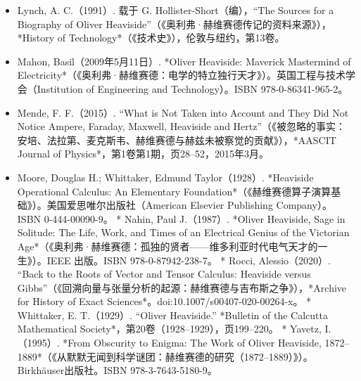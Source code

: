 \begin{itemize}
\item Lynch, A. C.（1991）. 载于 G. Hollister-Short（编），“The Sources for a Biography of Oliver Heaviside”（《奥利弗·赫维赛德传记的资料来源》），*History of Technology*（《技术史》），伦敦与纽约，第13卷。
\item Mahon, Basil（2009年5月11日）. *Oliver Heaviside: Maverick Mastermind of Electricity*（《奥利弗·赫维赛德：电学的特立独行天才》）。英国工程与技术学会（Institution of Engineering and Technology）。ISBN 978-0-86341-965-2。
\item Mende, F. F.（2015）. “What is Not Taken into Account and They Did Not Notice Ampere, Faraday, Maxwell, Heaviside and Hertz”（《被忽略的事实：安培、法拉第、麦克斯韦、赫维赛德与赫兹未被察觉的贡献》），*AASCIT Journal of Physics*，第1卷第1期，页28–52，2015年3月。
\item Moore, Douglas H.; Whittaker, Edmund Taylor（1928）. *Heaviside Operational Calculus: An Elementary Foundation*（《赫维赛德算子演算基础》）。美国爱思唯尔出版社（American Elsevier Publishing Company）。ISBN 0-444-00090-9。
* Nahin, Paul J.（1987）. *Oliver Heaviside, Sage in Solitude: The Life, Work, and Times of an Electrical Genius of the Victorian Age*（《奥利弗·赫维赛德：孤独的贤者——维多利亚时代电气天才的一生》）。IEEE 出版。ISBN 978-0-87942-238-7。
* Rocci, Alessio（2020）. “Back to the Roots of Vector and Tensor Calculus: Heaviside versus Gibbs”（《回溯向量与张量分析的起源：赫维赛德与吉布斯之争》），*Archive for History of Exact Sciences*。doi:10.1007/s00407-020-00264-x。
* Whittaker, E. T.（1929）. “Oliver Heaviside.” *Bulletin of the Calcutta Mathematical Society*，第20卷（1928–1929），页199–220。
* Yavetz, I.（1995）. *From Obscurity to Enigma: The Work of Oliver Heaviside, 1872–1889*（《从默默无闻到科学谜团：赫维赛德的研究（1872–1889）》）。Birkhäuser出版社。ISBN 978-3-7643-5180-9。

\end{itemize}